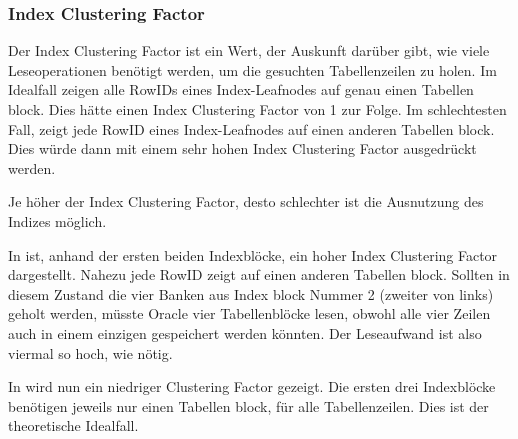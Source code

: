         \subsubsection{Index Clustering Factor}
          Der Index Clustering Factor ist ein Wert, der Auskunft dar\"uber gibt, wie viele Leseoperationen ben\"otigt werden, um die gesuchten Tabellenzeilen zu holen. Im Idealfall zeigen alle RowIDs eines Index-Leafnodes auf genau einen Tabellen block. Dies h\"atte einen Index Clustering Factor von 1 zur Folge. Im schlechtesten Fall, zeigt jede RowID eines Index-Leafnodes auf einen anderen Tabellen block. Dies w\"urde dann mit einem sehr hohen Index Clustering Factor ausgedr\"uckt werden.
          \begin{merke}
            Je h\"oher der Index Clustering Factor, desto schlechter ist die Ausnutzung des Indizes m\"oglich.
          \end{merke}
					In  ist, anhand der ersten beiden Indexbl\"ocke, ein hoher Index Clustering Factor dargestellt. Nahezu jede RowID zeigt auf einen anderen Tabellen block. Sollten in diesem Zustand die vier Banken aus Index block Nummer 2 (zweiter von links) geholt werden, m\"usste Oracle vier Tabellenbl\"ocke lesen, obwohl alle vier Zeilen auch in einem einzigen gespeichert werden k\"onnten. Der Leseaufwand ist also viermal so hoch, wie n\"otig.
\clearpage

          In  wird nun ein niedriger Clustering Factor gezeigt. Die ersten drei Indexbl\"ocke ben\"otigen jeweils nur einen Tabellen block, f\"ur alle Tabellenzeilen. Dies ist der theoretische Idealfall.


